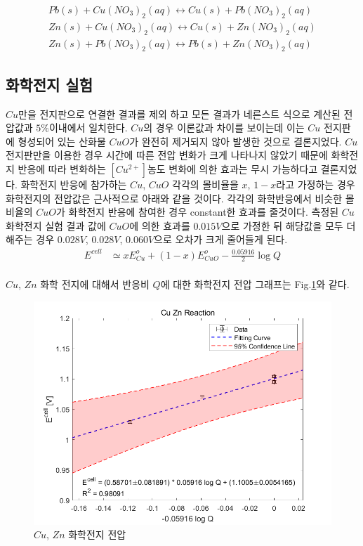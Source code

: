\documentclass[%
 reprint,
 amsmath,amssymb,
 aps,
]{revtex4-2}
\begin{document}
\begin{align}
Pb(s)+Cu(NO_{3})_{2}(aq)\leftrightarrow Cu(s) + Pb(NO_{3})_{2}(aq)\\
Zn(s)+Cu(NO_{3})_{2}(aq)\leftrightarrow Cu(s) + Zn(NO_{3})_{2}(aq)\\
Zn(s)+Pb(NO_{3})_{2}(aq)\leftrightarrow Pb(s) + Zn(NO_{3})_{2}(aq)
\end{align}

\subsection{\label{sec:level2}화학전지 실험}
$Cu$만을 전지판으로 연결한 결과를 제외 하고 모든 결과가 네른스트 식으로 계산된 전압값과 $5\%$이내에서 일치한다. $Cu$의 경우 이론값과 차이를 보이는데 이는 $Cu$ 전지판에 형성되어 있는 산화물 $CuO$가 완전히 제거되지 않아 발생한 것으로 결론지었다. $Cu$전지판만을 이용한 경우 시간에 따른 전압 변화가 크게 나타나지 않았기 때문에 화학전지 반응에 따라 변화하는 $[Cu^{2+}]$농도 변화에 의한 효과는 무시 가능하다고 결론지었다. 화학전지 반응에 참가하는 $Cu$, $CuO$ 각각의 몰비율을 $x$, $1-x$라고 가정하는 경우 화학전지의 전압값은 근사적으로 아래와 같을 것이다. 각각의 화학반응에서 비슷한 몰 비율의 $CuO$가 화학전지 반응에 참여한 경우 constant한 효과를 줄것이다. 측정된 $Cu$ 화학전지 실험 결과 값에 $CuO$에 의한 효과를 $0.015V$으로 가정한 뒤 해당값을 모두 더해주는 경우 $0.028V$, $0.028V$, $0.060V$으로 오차가 크게 줄어들게 된다.
\begin{align}
	E^{cell} &\simeq xE^{o}_{Cu} + (1-x)E^{o}_{CuO} - \frac{0.05916}{2}\log Q
\end{align}
\\

$Cu$, $Zn$ 화학 전지에 대해서 반응비 $Q$에 대한 화학전지 전압 그래프는 Fig.\ref{fig:CuZnReac}와 같다.

\begin{figure}[htbp]
	\includegraphics[width = 0.95\linewidth]{CuZnReac.png}%
	\caption{\label{fig:CuZnReac}$Cu$, $Zn$ 화학전지 전압}
\end{figure}
\end{document}
